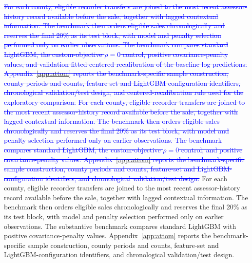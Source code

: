 \documentclass[10pt]{article}
\theoremstyle{definition}
\newcommand{\1}{\mathbf{1}}
\newcommand{\oldtext}[1]{\textcolor{blue}{\sout{#1}}}
\newcommand{\newtext}[1]{\textcolor{impGreen}{#1}}
\begin{document}

\oldtext{For each county, eligible recorder transfers are joined to the most recent assessor-history record available before the sale, together with lagged contextual information. The benchmark then orders eligible sales chronologically and reserves the final 20\% as its test block, with model and penalty selection performed only on earlier observations. The benchmark compares standard LightGBM, the custom-objective $\rho=0$ control, positive covariance-penalty values, and validation-fitted centered recalibration of the baseline log predictions. Appendix~\ref{app:attom} reports the benchmark-specific sample construction, county periods and counts, feature-set and LightGBM-configuration identifiers, chronological validation/test design, and centered-recalibration rule used for the exploratory comparison.}
\oldtext{For each county, eligible recorder transfers are joined to the most recent assessor-history record available before the sale, together with lagged contextual information. The benchmark then orders eligible sales chronologically and reserves the final 20\% as its test block, with model and penalty selection performed only on earlier observations. The benchmark compares standard LightGBM, the custom-objective $\rho=0$ control, and positive covariance-penalty values. Appendix~\ref{app:attom} reports the benchmark-specific sample construction, county periods and counts, feature-set and LightGBM-configuration identifiers, and chronological validation/test design.}
\newtext{For each county, eligible recorder transfers are joined to the most recent assessor-history record available before the sale, together with lagged contextual information. The benchmark then orders eligible sales chronologically and reserves the final 20\% as its test block, with model and penalty selection performed only on earlier observations. The substantive benchmark compares standard LightGBM with positive covariance-penalty values. Appendix~\ref{app:attom} reports the benchmark-specific sample construction, county periods and counts, feature-set and LightGBM-configuration identifiers, and chronological validation/test design.}
\end{document}
